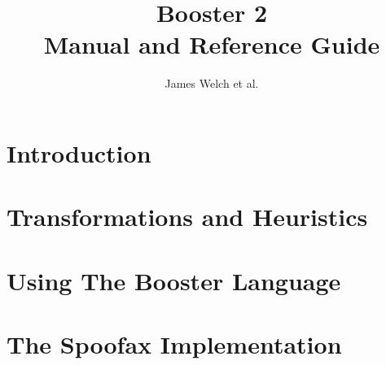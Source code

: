 \documentclass[12pt]{ociamthesis}  %
\title{Booster 2\\[1ex]Manual and Reference Guide}   %
\author{James Welch et al.}             %
\begin{document}
\setlength{\tabcolsep}{10pt}



\setcounter{secnumdepth}{3}
\setcounter{tocdepth}{3}


\maketitle                  %

\begin{romanpages}          %
\tableofcontents            %
\listoffigures              %
\end{romanpages}            %

\part{Introduction}






\part{Transformations and Heuristics}




\part{Using The Booster Language}



\part{The Spoofax Implementation}



\end{document}
